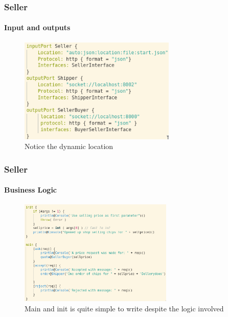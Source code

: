 \documentclass{beamer}
\begin{document}
    \begin{frame}[t]
        \frametitle{Seller}
        \framesubtitle{Input and outputs}
\begin{figure}[!h]
    \centering
    \includegraphics[height=5cm]{images2/sellerio.png}
    \caption{Notice the dynamic location}
    \label{fig:a2p2}
\end{figure}
    \end{frame}
    \begin{frame}[t]
        \frametitle{Seller}
        \framesubtitle{Business Logic}
\begin{figure}[!h]
    \centering
    \includegraphics[height=5cm]{images2/sellerlogic.png}
    \caption{Main and init is quite simple to write despite the logic involved}
    \label{fig:a2p2}
\end{figure}
    \end{frame}
\end{document}
